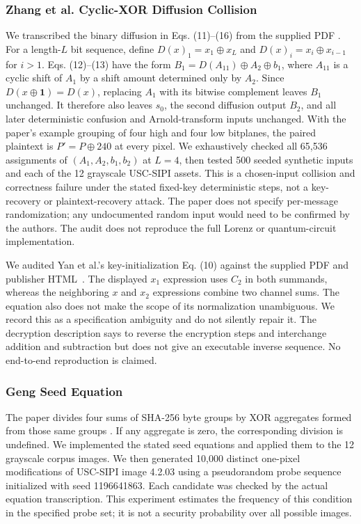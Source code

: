 \documentclass[letterpaper,journal]{IEEEtran}
\begin{document}
\subsubsection{Zhang et al. Cyclic-XOR Diffusion Collision}
We transcribed the binary diffusion in Eqs. (11)--(16) from the supplied PDF \cite{zhang2024}. For a length-$L$ bit sequence, define $D(x)_1=x_1\oplus x_L$ and $D(x)_i=x_i\oplus x_{i-1}$ for $i>1$. Eqs. (12)--(13) have the form $B_1=D(A_{11})\oplus A_2\oplus b_1$, where $A_{11}$ is a cyclic shift of $A_1$ by a shift amount determined only by $A_2$. Since $D(x\oplus\mathbf{1})=D(x)$, replacing $A_1$ with its bitwise complement leaves $B_1$ unchanged. It therefore also leaves $s_0$, the second diffusion output $B_2$, and all later deterministic confusion and Arnold-transform inputs unchanged. With the paper's example grouping of four high and four low bitplanes, the paired plaintext is $P'=P\oplus 240$ at every pixel. We exhaustively checked all 65,536 assignments of $(A_1,A_2,b_1,b_2)$ at $L=4$, then tested 500 seeded synthetic inputs and each of the 12 grayscale USC-SIPI assets. This is a chosen-input collision and correctness failure under the stated fixed-key deterministic steps, not a key-recovery or plaintext-recovery attack. The paper does not specify per-message randomization; any undocumented random input would need to be confirmed by the authors. The audit does not reproduce the full Lorenz or quantum-circuit implementation.

We audited Yan et al.'s key-initialization Eq. (10) against the supplied PDF and publisher HTML \,\cite{yan2025}. The displayed $x_1$ expression uses $C_2$ in both summands, whereas the neighboring $x$ and $x_2$ expressions combine two channel sums. The equation also does not make the scope of its normalization unambiguous. We record this as a specification ambiguity and do not silently repair it. The decryption description says to reverse the encryption steps and interchange addition and subtraction but does not give an executable inverse sequence. No end-to-end reproduction is claimed.

\subsubsection{Geng Seed Equation}
The paper divides four sums of SHA-256 byte groups by XOR aggregates formed from those same groups \cite{geng2025}. If any aggregate is zero, the corresponding division is undefined. We implemented the stated seed equations and applied them to the 12 grayscale corpus images. We then generated 10,000 distinct one-pixel modifications of USC-SIPI image 4.2.03 using a pseudorandom probe sequence initialized with seed 1196641863. Each candidate was checked by the actual equation transcription. This experiment estimates the frequency of this condition in the specified probe set; it is not a security probability over all possible images.
\end{document}
